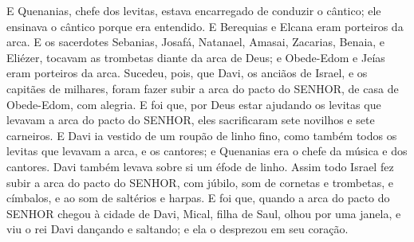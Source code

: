 {  E Quenanias, chefe dos levitas, estava encarregado de conduzir o cântico; ele ensinava o cântico porque era entendido.
  E Berequias e Elcana eram porteiros da arca.
  E os sacerdotes Sebanias, Josafá, Natanael, Amasai, Zacarias, Benaia, e Eliézer, tocavam as trombetas diante da arca de Deus; e Obede-Edom e Jeías eram porteiros da arca.
  Sucedeu, pois, que Davi, os anciãos de Israel, e os capitães de milhares, foram fazer subir a arca do pacto do SENHOR, de casa de Obede-Edom, com alegria.
  E foi que, por Deus estar ajudando os levitas que levavam a arca do pacto do SENHOR, eles sacrificaram sete novilhos e sete carneiros.
  E Davi ia vestido de um roupão de linho fino, como também todos os levitas que levavam a arca, e os cantores; e Quenanias era o chefe da música e dos cantores. Davi também levava sobre si um éfode de linho.
  Assim todo Israel fez subir a arca do pacto do SENHOR, com júbilo, som de cornetas e trombetas, e címbalos, e ao som de saltérios e harpas.
  E foi que, quando a arca do pacto do SENHOR chegou à cidade de Davi, Mical, filha de Saul, olhou por uma janela, e viu o rei Davi dançando e saltando; e ela o desprezou em seu coração.
\par }

